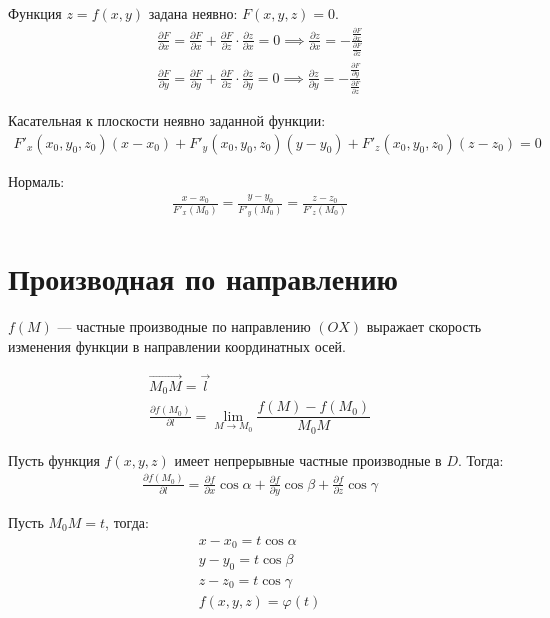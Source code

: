 \documentclass[a4paper,12pt,oneside]{extbook}
\theoremstyle{numbered}
\theoremstyle{unnumbered}
\theoremstyle{named}
\theoremstyle{unnumbered}
\theoremstyle{named}
\theoremstyle{named}
\theoremstyle{named}
\begin{document}
Функция \(z = f(x, y)\) задана неявно: \(F(x, y, z) = 0\).
\begin{gather*}
    \frac{\partial F}{\partial x} = \frac{\partial F}{\partial x} + \frac{\partial F}{\partial z} \cdot \frac{\partial z}{\partial x} = 0 \implies \frac{\partial z}{\partial x} = - \frac{\frac{\partial F}{\partial x}}{\frac{\partial F}{\partial z}} \\
    \frac{\partial F}{\partial y} = \frac{\partial F}{\partial y} + \frac{\partial F}{\partial z} \cdot \frac{\partial z}{\partial y} = 0 \implies \frac{\partial z}{\partial y} = - \frac{\frac{\partial F}{\partial y}}{\frac{\partial F}{\partial z}}
\end{gather*}

Касательная к плоскости неявно заданной функции:
\begin{gather*}
    F'_x(x_0, y_0, z_0)(x - x_0) + F'_y(x_0, y_0, z_0)(y - y_0) + F'_z(x_0, y_0, z_0)(z - z_0) = 0
\end{gather*}

Нормаль:
\begin{gather*}
    \frac{x - x_0}{F'_x(M_0)} = \frac{y - y_0}{F'_y(M_0)} = \frac{z - z_0}{F'_z(M_0)}
\end{gather*}

\section{Производная по направлению}%
\label{sec:Производная по направлению}

\(f(M)\) — частные производные по направлению \((OX)\) выражает скорость изменения функции в направлении координатных осей.

\begin{gather*}
    \overrightarrow{M_0 M} = \overrightarrow{l} \\
    \frac{\partial f(M_0)}{\partial l} = \lim_{M \to M_0}{\dfrac{f(M) - f(M_0)}{M_0M}}
\end{gather*}

Пусть функция \(f(x, y, z)\) имеет непрерывные частные производные в \(D\). Тогда:
\begin{gather*}
    \frac{\partial f(M_0)}{\partial l} = \frac{\partial f}{\partial x} \cos{\alpha} + \frac{\partial f}{\partial y} \cos{\beta} + \frac{\partial f}{\partial z} \cos{\gamma}
\end{gather*}

Пусть \(M_0M = t\), тогда:
\begin{gather*}
    x - x_0 = t\cos{\alpha} \\
    y - y_0 = t\cos{\beta} \\
    z - z_0 = t\cos{\gamma} \\
    f(x, y, z) = \varphi(t)
\end{gather*}
\end{document}
